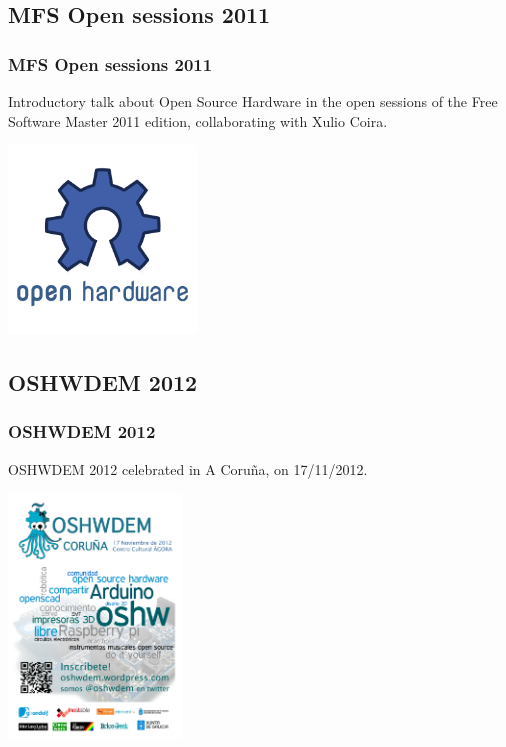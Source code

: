 \documentclass[slidestop,compress,mathserif]{beamer}
\begin{document}
\subsection{MFS Open sessions 2011}
\begin{frame}
  \frametitle{MFS Open sessions 2011}
  Introductory talk about Open Source Hardware in the open sessions of the Free Software Master 2011 edition, collaborating with Xulio Coira.

  \begin{center}
    \includegraphics[height=5cm]{images/ohw-logo.png}
  \end{center}

\end{frame}

\subsection{OSHWDEM 2012}
\begin{frame}
  \frametitle{OSHWDEM 2012}
  OSHWDEM 2012 celebrated in A Coru\~na, on 17/11/2012.

  \begin{center}
    \includegraphics[height=6.5cm]{images/cartel-oshwdem5-300.png}
  \end{center}

\end{frame}
\end{document}
